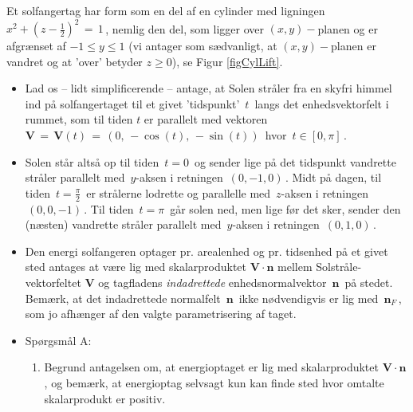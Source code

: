 

\begin{exercise} \label{exercCyl1}
Et {solfangertag} har form som en del af en cylinder
med ligningen $x^{2} + \left(z-\frac{1}{2}\right)^{2} \, = \, 1\, $, nemlig den del, som ligger over $(x,y)-$planen og er afgrænset af $-1 \leq y \leq 1$ (vi antager som sædvanligt, at $(x,y)-$planen er vandret og at 'over' betyder $z \geq 0$), se
Figur \ref{figCylLift}.
\begin{itemize}
\item Lad os -- lidt simplificerende -- antage, at Solen stråler fra en skyfri himmel ind
på solfangertaget til et givet 'tidspunkt'
$\,t\,$ langs det enhedsvektorfelt i rummet, som
til tiden $t$ er pa\-ral\-lelt med vektoren
${\mathbf{V}}\, = \, {\mathbf{V}}(t)\, = \, (0,\,
-\cos(t),\, -\sin(t))\, $ hvor $\, t \in [0,
\pi]\, $.

\item Solen står altså op til tiden $\,t=0\,$ og sender lige på det
tidspunkt vandrette stråler parallelt med $\,y$-aksen i retningen
$\, (0, -1, 0)\, $. Midt på dagen, til tiden $\, t= \frac{\pi}{2}\,$
er strålerne lodrette og parallelle med $\,z$-aksen i retningen $\,
(0, 0, -1)\, $. Til tiden $\, t=\pi\,$ går solen ned, men lige før
det sker, sender den (næsten) vandrette stråler parallelt med
$\,y$-aksen i retningen $\, (0, 1, 0)\, $.

\item Den energi solfangeren optager pr. arealenhed og pr. tidsenhed
på et givet sted antages at være lig med
skalarproduktet ${\mathbf{V}}\cdot {\mathbf{n}}$ mellem
Solstråle-vektorfeltet ${\mathbf{V}}$ og tagfladens
{\em{indadrettede}} enhedsnormalvektor
$\,{\mathbf{n}}\,$ på stedet. Bemærk, at det
indadrettede normalfelt  $\,{\mathbf{n}}\,$ ikke
nødvendigvis er lig med $\,{\mathbf{n}}_{F}\,$, som
jo afhænger af den valgte parametrisering af
taget.
\end{itemize}

\begin{itemize}
\item Spørgsmål A:
\begin{enumerate}
\item Begrund antagelsen om, at energioptaget er
lig med skalarproduktet ${\mathbf{V}}\cdot {\mathbf{n}}$,
og bemærk, at energioptag selvsagt kun kan finde
sted hvor omtalte skalarprodukt er positiv.


\end{enumerate}
\end{itemize}
\end{exercise}
